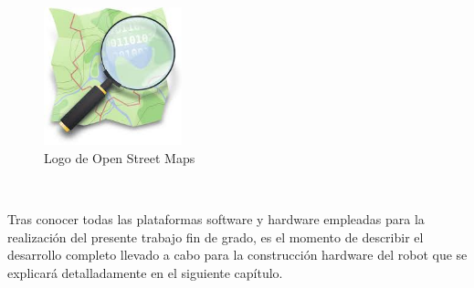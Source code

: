 \begin{figure} [h!]
	\begin{center}
		\includegraphics[width=4cm]{figs/osm.png}
	\end{center}
	\caption{Logo de Open Street Maps}  %
	\label{fig:osm}
\end{figure}\ 




Tras conocer todas las plataformas software y hardware empleadas para la realización del presente trabajo fin de grado, es el momento de describir el desarrollo completo llevado a cabo para la construcción hardware del robot que se explicará detalladamente en el siguiente capítulo.
